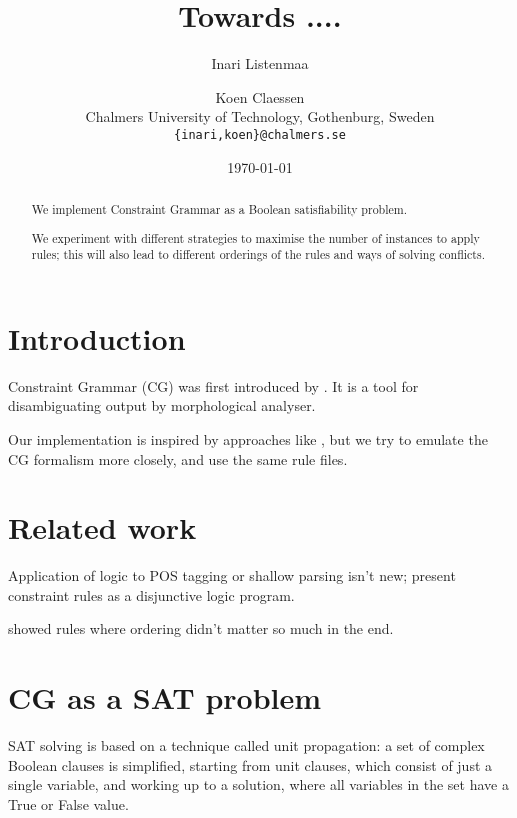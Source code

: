 \documentclass[11pt]{article}
\title{Towards ....}
\author{Inari Listenmaa \and Koen Claessen \\
  Chalmers University of Technology, Gothenburg, Sweden \\
  {\tt \{inari,koen\}@chalmers.se} }
\date{\today}
\begin{document}
\maketitle
\begin{abstract}
We implement Constraint Grammar as a Boolean satisfiability problem.

We experiment with different strategies to maximise the number of instances to apply rules;
this will also lead to different orderings of the rules and ways of solving conflicts.


\end{abstract}


\section{Introduction}
Constraint Grammar (CG) was first introduced by \cite{karlsson1995constraint}. 
It is a tool for disambiguating output by morphological analyser.

Our implementation is inspired by approaches like \cite{lager98,lager_nivre01},
but we try to emulate the CG formalism more closely, and use the same rule files.

\section{Related work}
\label{sect:related}

Application of logic to POS tagging or shallow parsing isn't new;
\cite{lager98,lager_nivre01} present constraint rules as 
a disjunctive logic program.

\cite{lindberg_eineborg98ilp,asfrent14}


\cite{lager01transformation} showed rules where ordering didn't matter so much in the end.



\section{CG as a SAT problem}
\label{sect:pdf}

SAT solving is based on a technique called unit propagation:
a set of complex Boolean clauses is simplified, starting from unit
clauses, which consist of just a single variable, and working up to a
solution, where all variables in the set have a True or False value.
\end{document}
